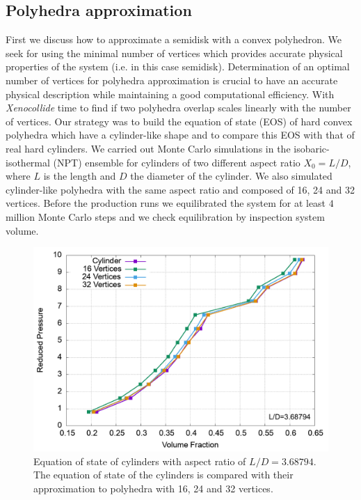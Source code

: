 \documentclass[aip,jcp, amsmath, amssymb, reprint]{revtex4-1}
\begin{document}

\subsection{Polyhedra approximation}
First we discuss how to approximate a semidisk with a convex polyhedron. We seek for using the minimal number of vertices
which provides accurate physical properties of the system (i.e. in this case semidisk).
Determination of an optimal number of vertices for polyhedra approximation is crucial to have an accurate physical
description while maintaining a good computational efficiency.
With \textit{Xenocollide} time to find if two polyhedra overlap scales linearly with the number of vertices.
Our strategy was to build the equation of state (EOS) of hard convex polyhedra which have a cylinder-like shape and to 
compare this EOS with that of real hard cylinders.
We carried out Monte Carlo simulations in the isobaric-isothermal (NPT) ensemble for
cylinders of two different aspect ratio $X_0=L/D$, where $L$ is the length and $D$ the diameter of the cylinder. 
We also simulated cylinder-like polyhedra with the same aspect ratio and composed of 16, 24 and 32 vertices.
Before the production runs we equilibrated the system for at least $4$ million Monte Carlo steps and we check 
equilibration by inspection system volume.
\begin{figure}[h!] \includegraphics[width=0.9\linewidth]{cylapprox.png}
  \caption{\label{fig:cylapprox} Equation of state of cylinders with aspect ratio of $L/D=3.68794$. The equation of
  state of the cylinders is compared with their approximation to polyhedra with 16, 24 and 32 vertices.}
\end{figure}
\end{document}
